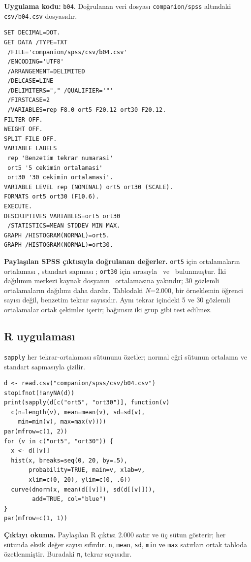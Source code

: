\textbf{Uygulama kodu:} \texttt{b04}. Doğrulanan veri dosyası
\texttt{companion/spss} altındaki \texttt{csv/b04.csv} dosyasıdır.

\begin{lstlisting}[style=prismSPSS]
SET DECIMAL=DOT.
GET DATA /TYPE=TXT
 /FILE='companion/spss/csv/b04.csv'
 /ENCODING='UTF8'
 /ARRANGEMENT=DELIMITED
 /DELCASE=LINE
 /DELIMITERS="," /QUALIFIER='"'
 /FIRSTCASE=2
 /VARIABLES=rep F8.0 ort5 F20.12 ort30 F20.12.
FILTER OFF.
WEIGHT OFF.
SPLIT FILE OFF.
VARIABLE LABELS
 rep 'Benzetim tekrar numarasi'
 ort5 '5 cekimin ortalamasi'
 ort30 '30 cekimin ortalamasi'.
VARIABLE LEVEL rep (NOMINAL) ort5 ort30 (SCALE).
FORMATS ort5 ort30 (F10.6).
EXECUTE.
DESCRIPTIVES VARIABLES=ort5 ort30
 /STATISTICS=MEAN STDDEV MIN MAX.
GRAPH /HISTOGRAM(NORMAL)=ort5.
GRAPH /HISTOGRAM(NORMAL)=ort30.
\end{lstlisting}

\begin{outputguidebox}
\textbf{Paylaşılan SPSS çıktısıyla doğrulanan değerler.}
\texttt{ort5} için ortalamaların ortalaması \SPSimFiveMean, standart
sapması \SPSimFiveSD; \texttt{ort30} için sırasıyla \SPSimThirtyMean\ ve
\SPSimThirtySD\ bulunmuştur. İki dağılımın merkezi kaynak dosyanın
\SPMatMean\ ortalamasına yakındır; 30 gözlemli ortalamaların dağılımı daha
dardır. Tablodaki \emph{N}=2.000, bir örneklemin öğrenci sayısı değil,
benzetim tekrar sayısıdır. Aynı tekrar içindeki 5 ve 30 gözlemli ortalamalar
ortak çekimler içerir; bağımsız iki grup gibi test edilmez.
\end{outputguidebox}


\par\noindent\begin{minipage}{\linewidth}
\subsection{R uygulaması}
\label{sec:r-gercek-b04}

\texttt{sapply} her tekrar-ortalaması sütununu özetler; normal eğri sütunun ortalama ve standart sapmasıyla çizilir.

\begin{lstlisting}[style=prismR]
d <- read.csv("companion/spss/csv/b04.csv")
stopifnot(!anyNA(d))
print(sapply(d[c("ort5", "ort30")], function(v)
  c(n=length(v), mean=mean(v), sd=sd(v),
    min=min(v), max=max(v))))
par(mfrow=c(1, 2))
for (v in c("ort5", "ort30")) {
  x <- d[[v]]
  hist(x, breaks=seq(0, 20, by=.5),
       probability=TRUE, main=v, xlab=v,
       xlim=c(0, 20), ylim=c(0, .6))
  curve(dnorm(x, mean(d[[v]]), sd(d[[v]])),
        add=TRUE, col="blue")
}
par(mfrow=c(1, 1))
\end{lstlisting}

\textbf{Çıktıyı okuma.} Paylaşılan R çıktısı 2.000 satır ve üç sütun
gösterir; her sütunda eksik değer sayısı sıfırdır. \texttt{n},
\texttt{mean}, \texttt{sd}, \texttt{min} ve \texttt{max} satırları
ortak tabloda özetlenmiştir. Buradaki \texttt{n}, tekrar sayısıdır.
\end{minipage}\par

